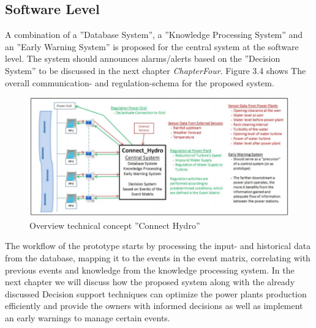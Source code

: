 \subsection{Software Level}
A combination of a ”Database System”, a ”Knowledge Processing System” and an ”Early Warning System” is proposed for the central system at the software level.\cite{SEIT2017} The system should announces alarms/alerts based on the ”Decision System” to be discussed in the next chapter \textit{ChapterFour}. Figure 3.4 shows The overall communication- and regulation-schema for the proposed system.
\begin{figure}[H]
\centering
\includegraphics[scale=0.5]{Images/ConnectHydro.png}
\caption[Overview technical concept ”Connect Hydro”]{Overview technical concept ”Connect Hydro” \cite{SEIT2017}}
\end{figure}
The workflow of the prototype starts by processing the input- and historical data from the database, mapping it to the
events in the event matrix, correlating with previous events and knowledge from the knowledge processing system. In the next chapter we will discuss how the proposed system along with the already discussed Decision support techniques can optimize the power plants production efficiently and provide the owners with informed decisions as well as implement an early warnings to manage certain events.
